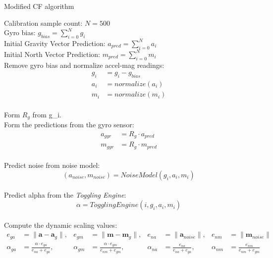 \documentclass{iutbscthesis}
\begin{document}
\begin{algorithm} 
\caption{Modified CF algorithm} \label{CFalgo}
\DontPrintSemicolon
\SetAlgoLined
{} %
\linespread{0.5}  

\vspace{12pt}
Calibration sample count: $N=500$\\
Gyro bias: $g_{bias} = \sum_{i=0}^{N}g_i$ \\
Initial Gravity Vector Prediction: $a_{pred} = \sum_{i=0}^{N}a_i $ \\
Initial North Vector Prediction: $m_{pred} = \sum_{i=0}^{N}m_i $ \\
\vspace{12pt}
{
Remove gyro bias and normalize accel-mag readings: 
\begin{align*}
    g_i&=g_i-g_{bias}\\
    a_i&=normalize(a_i)\\
    m_i&=normalize(m_i)
\end{align*}\\
Form $R_g$ from g_i.\\
Form the predictions from the gyro sensor:
\begin{align*}
a_{gyr} &= R_g\cdot a_{pred}\\
m_{gyr} &= R_g\cdot m_{pred}   
\end{align*}\\

Predict noise from noise model: $$(a_{noise},m_{noise}) = NoiseModel(g_i,a_i,m_i)$$\\
Predict alpha from the \textit{Toggling Engine}: $$\alpha = TogglingEngine(i,g_i,a_i,m_i)$$\\

Compute the dynamic scaling values:
\begin{align*}
e_{ga} &= \lVert \mathbf{a} - \mathbf{a}_g \rVert, &
e_{gm} &= \lVert \mathbf{m} - \mathbf{m}_g \rVert, &
e_{na} &= \lVert \mathbf{a}_{noise} \rVert, &
e_{nm} &= \lVert \mathbf{m}_{noise} \rVert \\
\alpha_{ga} &= \frac{\alpha \cdot e_{ga}}{e_{na} + e_{ga}}, &
\alpha_{gm} &= \frac{\alpha \cdot e_{gm}}{e_{nm} + e_{gm}}, &
\alpha_{na} &= \frac{e_{na}}{e_{na} + e_{ga}}, &
\alpha_{nm} &= \frac{e_{nm}}{e_{nm} + e_{gm}}
\end{align*}\\

}
\end{algorithm}
\end{document}
